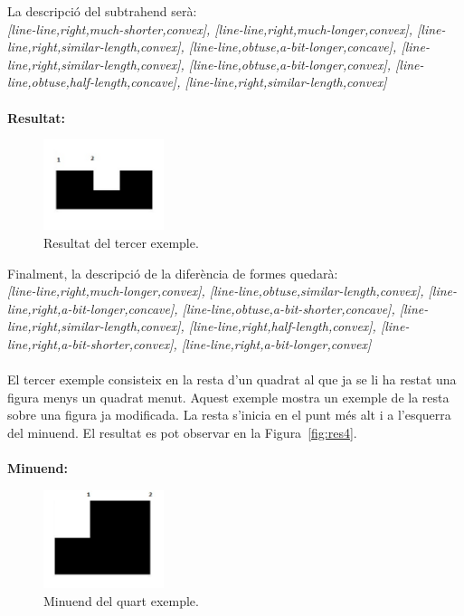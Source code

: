 \documentclass{article}
\begin{document}
La descripció del subtrahend serà:
\\
\emph {[line-line,right,much-shorter,convex], [line-line,right,much-longer,convex], [line-line,right,similar-length,convex], [line-line,obtuse,a-bit-longer,concave], [line-line,right,similar-length,convex], [line-line,obtuse,a-bit-longer,convex], [line-line,obtuse,half-length,concave], [line-line,right,similar-length,convex]}
\\
\\
{\bf Resultat:}
\begin{figure}[!h]
\centering
\includegraphics[width=100pt]{images/res3.jpg}
\caption {Resultat del tercer exemple.}
\label {fig:res3}
\end{figure}

Finalment, la descripció de la diferència de formes quedarà:
\\
\emph {[line-line,right,much-longer,convex], [line-line,obtuse,similar-length,convex], [line-line,right,a-bit-longer,concave], [line-line,obtuse,a-bit-shorter,concave], [line-line,right,similar-length,convex], [line-line,right,half-length,convex], [line-line,right,a-bit-shorter,convex], [line-line,right,a-bit-longer,convex]}
\\
\\
El tercer exemple consisteix en la resta d'un quadrat al que ja se li ha restat una figura menys un quadrat menut.
Aquest exemple mostra un exemple de la resta sobre una figura ja modificada.
La resta s'inicia en el punt més alt i a l'esquerra del minuend.
El resultat es pot observar en la Figura~\ref{fig:res4}.
\\
\\

{\bf Minuend:}
\begin{figure}[!h]
\centering
\includegraphics[width=100pt]{images/quad_gran_restat.jpg}
\caption {Minuend del quart exemple.}
\label {fig:quad_gran_restat}
\end{figure}
\end{document}
